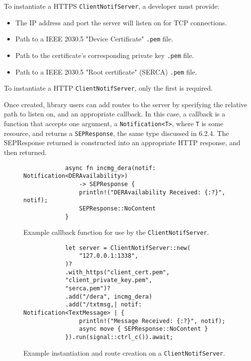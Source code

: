 To instantiate a HTTPS \texttt{ClientNotifServer}, a developer must provide:

\begin{itemize}
    \item The IP address and port the server will listen on for TCP connections.
    \item Path to a IEEE 2030.5 "Device Certificate" \texttt{.pem} file.
    \item Path to the certificate's corresponding private key \texttt{.pem} file.
    \item Path to a IEEE 2030.5 "Root certificate" (SERCA) \texttt{.pem} file. 
\end{itemize}

To instantiate a HTTP \texttt{ClientNotifServer}, only the first is required.

Once created, library users can add routes to the server by specifying the relative path to listen on, and an appropriate callback. In this case, a callback is a function that accepts one argument, a \texttt{Notification<T>}, where \texttt{T} is some resource, and returns a \texttt{SEPResponse}, the same type discussed in 6.2.4. The SEPResponse returned is constructed into an appropriate HTTP response, and then returned.

\begin{figure}[h]
    \begin{center}
        \begin{lstlisting}
            async fn incmg_dera(notif: Notification<DERAvailability>)
                -> SEPResponse {
                println!("DERAvailability Received: {:?}", notif);
                SEPResponse::NoContent
            }
        \end{lstlisting}
        \label{fig:notiffn}
        \vspace{-10pt}
        \caption{Example callback function for use by the \texttt{ClientNotifServer}.}
    \end{center}
\end{figure}

\begin{figure}[h]
    \begin{center}
        \begin{lstlisting}
            let server = ClientNotifServer::new(
                "127.0.0.1:1338",
            )?
            .with_https("client_cert.pem",
            "client_private_key.pem",
            "serca.pem")?
            .add("/dera", incmg_dera)
            .add("/txtmsg,| notif: Notification<TextMessage> | {
                println!("Message Received: {:?}", notif);
                async move { SEPResponse::NoContent }
            }).run(signal::ctrl_c()).await;
        \end{lstlisting}
        \label{fig:notifroutes}
        \vspace{-10pt}
        \caption{Example instantiation and route creation on a \texttt{ClientNotifServer}.}
    \end{center}
\end{figure}

